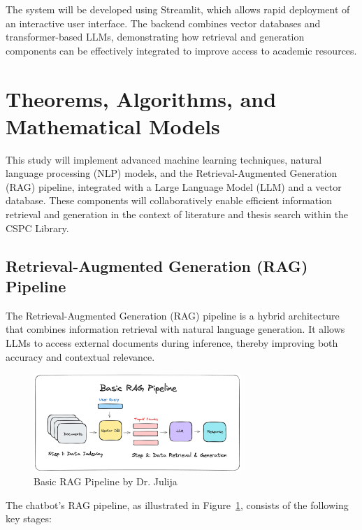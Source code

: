 \begin{refsection}
The system will be developed using Streamlit, which allows rapid deployment of an interactive user interface. The backend combines vector databases and transformer-based LLMs, demonstrating how retrieval and generation components can be effectively integrated to improve access to academic resources.

\section{Theorems, Algorithms, and Mathematical Models}

This study will implement advanced machine learning techniques, natural language processing (NLP) models, and the Retrieval-Augmented Generation (RAG) pipeline, integrated with a Large Language Model (LLM) and a vector database. These components will collaboratively enable efficient information retrieval and generation in the context of literature and thesis search within the CSPC Library.

\subsection{Retrieval-Augmented Generation (RAG) Pipeline}

The Retrieval-Augmented Generation (RAG) pipeline is a hybrid architecture that combines information retrieval with natural language generation. It allows LLMs to access external documents during inference, thereby improving both accuracy and contextual relevance.

\begin{figure}[htbp]
    \centering
    \includegraphics[width=0.7\textwidth]{figures/rag.png}
    \caption{Basic RAG Pipeline by Dr. Julija}
    \label{fig:rag}
\end{figure}

The chatbot’s RAG pipeline, as illustrated in Figure~\ref{fig:rag}, consists of the following key stages:


\end{refsection}

